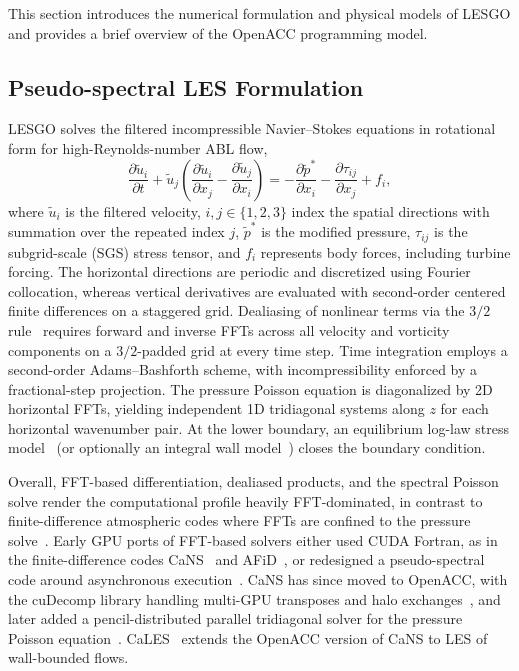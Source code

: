This section introduces the numerical formulation and physical models of LESGO and provides a brief overview of the OpenACC programming model.

\subsection{Pseudo-spectral LES Formulation}
\label{sec:bg-numerics}

LESGO solves the filtered incompressible Navier--Stokes equations in
rotational form for high-Reynolds-number ABL flow,
%
\begin{equation}
\frac{\partial \tilde{u}_i}{\partial t}
+ \tilde{u}_j\!\left(\frac{\partial \tilde{u}_i}{\partial x_j}
- \frac{\partial \tilde{u}_j}{\partial x_i}\right)
= -\frac{\partial \tilde{p}^{*}}{\partial x_i}
- \frac{\partial \tau_{ij}}{\partial x_j}
+ f_i ,
\label{eq:les}
\end{equation}
%
where $\tilde{u}_i$ is the filtered velocity, $i,j \in \{1,2,3\}$ index
the spatial directions with summation over the repeated index $j$,
$\tilde{p}^{*}$ is the modified pressure, $\tau_{ij}$ is the
subgrid-scale (SGS) stress tensor, and $f_i$ represents body forces,
including turbine forcing. The horizontal
directions are periodic and discretized using Fourier collocation, whereas 
vertical derivatives are evaluated with second-order centered finite 
differences on a staggered grid. Dealiasing of nonlinear terms via the $3/2$ 
rule~\cite{orszag1971} requires forward and inverse FFTs across all velocity 
and vorticity components on a $3/2$-padded grid at every time step. 
Time integration employs a second-order Adams--Bashforth scheme, with
incompressibility enforced by a fractional-step projection. The pressure 
Poisson equation is diagonalized by 2D horizontal FFTs, yielding independent 
1D tridiagonal systems along $z$ for each horizontal wavenumber pair. At 
the lower boundary, an equilibrium log-law stress model~\cite{moeng1984} 
(or optionally an integral wall model~\cite{yang2015iwm}) closes the boundary 
condition. 

Overall, FFT-based differentiation, dealiased products, and the spectral 
Poisson solve render the computational profile heavily FFT-dominated, 
in contrast to finite-difference atmospheric codes where FFTs are confined to 
the pressure solve~\cite{esclapez2025dales,vanheerwaarden2017}.
Early GPU ports of FFT-based solvers either used CUDA Fortran, as in
the finite-difference codes CaNS~\cite{costa2021} and
AFiD~\cite{zhu2018afid}, or redesigned a pseudo-spectral code around
asynchronous execution~\cite{ravikumar2019}.
CaNS has since moved to OpenACC, with the
cuDecomp library handling multi-GPU transposes and halo
exchanges~\cite{romero2022}, and later added a pencil-distributed parallel
tridiagonal solver for the pressure Poisson equation~\cite{diezsanhueza2025}.
CaLES~\cite{xiao2025cales} extends the OpenACC version of CaNS to LES of
wall-bounded flows. 

